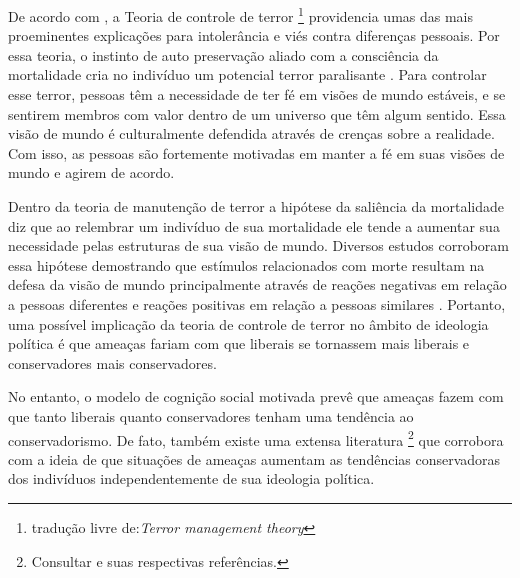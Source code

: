 De acordo com , a Teoria de controle de terror \footnote{
tradução livre de:\textit{Terror management theory} } \citep{Greenberg1992}
providencia umas das mais proeminentes explicações para intolerância
e viés contra diferenças pessoais. Por essa teoria, o instinto de auto
preservação aliado com a consciência da mortalidade cria no indivíduo um
potencial terror paralisante \citep{Arndt1997,Solomon2004}.  Para controlar
esse terror, pessoas têm a necessidade de ter fé em visões de mundo
estáveis, e se sentirem membros com valor dentro de um universo que têm algum
sentido. Essa visão de mundo é culturalmente defendida através de crenças
sobre a realidade. Com isso, as pessoas são fortemente motivadas em manter
a fé em suas visões de mundo e agirem de acordo.

Dentro da teoria de manutenção de terror a hipótese da saliência da mortalidade
diz que ao relembrar um indivíduo de sua mortalidade ele tende a aumentar sua
necessidade pelas estruturas de sua visão de mundo. Diversos estudos
corroboram essa hipótese demostrando que estímulos relacionados com morte
resultam na defesa da visão de mundo principalmente através de reações
negativas em relação a pessoas diferentes e reações positivas em relação a
pessoas similares \citep{Rosenblatt1989,Burke2010}. 
Portanto, uma possível implicação da teoria de controle de terror no âmbito
de ideologia política é que ameaças fariam com que liberais se tornassem mais
liberais e conservadores mais conservadores. 

No entanto, o modelo de cognição social motivada \citep{Jost2003} prevê
que ameaças fazem com que tanto liberais quanto conservadores tenham uma
tendência ao conservadorismo. De fato, também existe uma extensa literatura
\footnote{Consultar \citep{Jost2006,Nail2009} e suas respectivas referências.}
que corrobora com a ideia de que situações de ameaças aumentam as tendências
conservadoras dos indivíduos independentemente de sua ideologia política.

